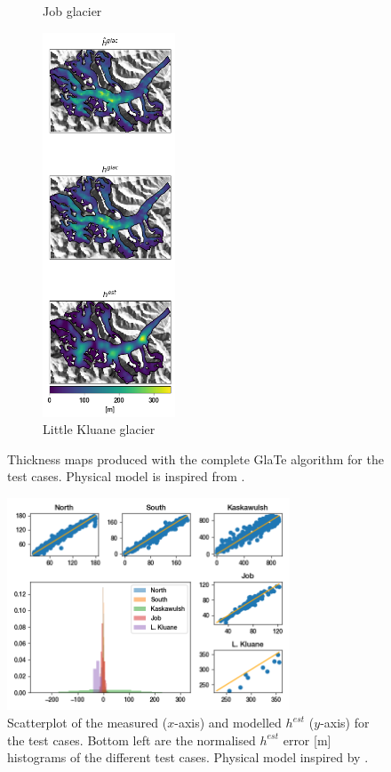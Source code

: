 \documentclass[a4, 12pt]{article}
\begin{document}
\begin{landscape}
\begin{figure}[h!]
{\begin{subfigure}{0.225\linewidth}
\caption{Job glacier}
\label{fig:glate_job_thickness}
\end{subfigure}
\hfill
\begin{subfigure}{0.225\linewidth}
\centering
\includegraphics[height=4.5in]{../imgs/little Kluane glacier/glate_thickness_all_models.png}
\caption{Little Kluane glacier}
\label{fig:glate_lk_thickness}
\end{subfigure}
}
\caption{Thickness maps produced with the complete GlaTe algorithm for the test cases. Physical model is inspired from \citet{clarke2013ice}.}
\label{fig:glate_thickness}
\end{figure}
\end{landscape}
\FloatBarrier


\begin{figure}[h!]
\centering
\includegraphics[width=0.75\textwidth]{../imgs/fiveplot_glate_full.png}
\caption{Scatterplot of the measured ($x$-axis) and modelled $h^{est}$ ($y$-axis) for the test cases. Bottom left are the normalised $h^{est}$ error [m] histograms of the different test cases. Physical model inspired by \citet{clarke2013ice}.}
\label{fig:glate_xy}
\end{figure}
\end{document}
